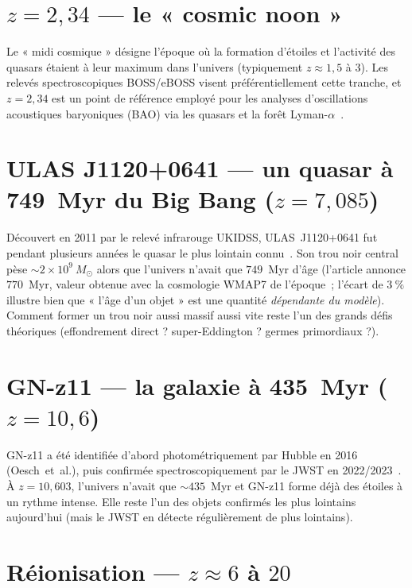 \documentclass[11pt,a4paper,openany]{report}
\begin{document}
\section{$z = 2{,}34$ --- le « cosmic noon »}

Le « midi cosmique » désigne l'époque où la formation d'étoiles et l'activité
des quasars étaient à leur maximum dans l'univers (typiquement $z \approx
1{,}5$ à $3$). Les relevés spectroscopiques BOSS/eBOSS visent
préférentiellement cette tranche, et $z=2{,}34$ est un point de référence
employé pour les analyses d'oscillations acoustiques baryoniques (BAO) via
les quasars et la forêt Lyman-$\alpha$~\cite{Bautista2017}.

\section{ULAS J1120+0641 --- un quasar à 749~Myr du Big Bang ($z = 7{,}085$)}

Découvert en 2011 par le relevé infrarouge UKIDSS, ULAS~J1120+0641 fut pendant
plusieurs années le quasar le plus lointain connu~\cite{Mortlock2011}. Son
trou noir central pèse $\sim 2\times 10^{9}~M_{\odot}$ alors que l'univers
n'avait que $749$~Myr d'âge (l'article annonce $770$~Myr, valeur obtenue avec
la cosmologie WMAP7 de l'époque~; l'écart de $3~\%$ illustre bien que
« l'âge d'un objet » est une quantité \emph{dépendante du modèle}). Comment former un trou noir aussi massif
aussi vite reste l'un des grands défis théoriques (effondrement direct ?
super-Eddington ? germes primordiaux ?).

\section{GN-z11 --- la galaxie à 435~Myr ($z = 10{,}6$)}

GN-z11 a été identifiée d'abord photométriquement par Hubble en 2016
(Oesch~et~al.), puis confirmée spectroscopiquement par le JWST en
2022/2023~\cite{Bunker2023}. À $z = 10{,}603$, l'univers n'avait que $\sim
435$~Myr et GN-z11 forme déjà des étoiles à un rythme intense. Elle reste
l'un des objets confirmés les plus lointains aujourd'hui (mais le JWST en
détecte régulièrement de plus lointains).

\section{Réionisation --- $z \approx 6$ à $20$}
\end{document}
